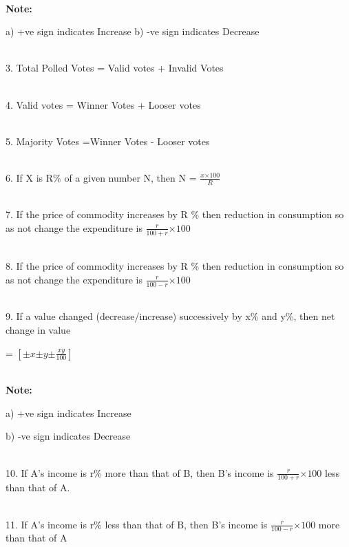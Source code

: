 \documentclass{article}
\begin{document}
\noindent \\  \textbf{Note:}


a)   +ve sign indicates Increase 
b)  -ve sign indicates Decrease



\noindent \\ 3.   Total Polled Votes = Valid votes + Invalid Votes

\noindent 

\noindent \\  4.  Valid votes = Winner Votes + Looser votes

\noindent 

\noindent \\  5.   Majority Votes =Winner Votes - Looser votes



\noindent \\  6.   If X is R\% of a given number N, then N = $ \frac{x \mathrm{\times} 100}{R} $



\noindent \\ 7.   If the price of commodity increases by R \% then reduction in consumption so as not change the expenditure is $ \frac{r}{100 + r} \mathrm{\times} 100  $


\noindent \\ 8.   If the price of commodity increases by R \% then reduction in consumption so as not change the expenditure is $ \frac{r}{100 - r} \mathrm{\times} 100  $

\noindent 

\noindent \\ 9.   If a value changed (decrease/increase) successively by x\% and y\%, then net change in value

= $[\mathrm{\pm}x \mathrm{\pm}y \mathrm{\pm} \frac{xy}{100} ]$



\noindent \\ \textbf{Note: \\}

a)   +ve sign indicates Increase

b)  -ve sign indicates Decrease

\noindent \\ 10. If A's income is r\% more than that of B, then B's income is $\frac{r}{100 + r} \mathrm{\times} 100$ less than that of A.

\noindent \\ 11. If A's income is r\% less than that of B, then B's income is $\frac{r}{100 - r} \mathrm{\times} 100$ more than that of A
\end{document}
